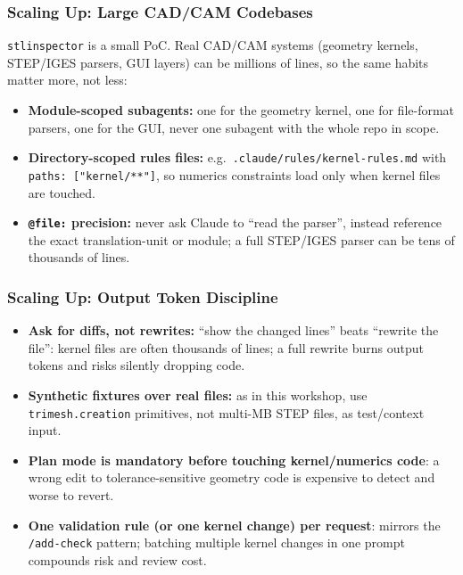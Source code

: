 \begin{frame}[fragile]\frametitle{Scaling Up: Large CAD/CAM Codebases}
\texttt{stlinspector} is a small PoC. Real CAD/CAM systems (geometry kernels, STEP/IGES parsers, GUI layers) can be millions of lines, so the same habits matter more, not less:
  \begin{itemize}
    \item \textbf{Module-scoped subagents:} one for the geometry kernel, one for file-format parsers, one for the GUI, never one subagent with the whole repo in scope.
    \item \textbf{Directory-scoped rules files:} e.g.\ \texttt{.claude/rules/\allowbreak kernel-rules.md} with \texttt{paths: ["kernel/**"]}, so numerics constraints load only when kernel files are touched.
    \item \textbf{\texttt{@file:} precision:} never ask Claude to ``read the parser'', instead reference the exact translation-unit or module; a full STEP/IGES parser can be tens of thousands of lines.
  \end{itemize}
\end{frame}


\begin{frame}[fragile]\frametitle{Scaling Up: Output Token Discipline}
  \begin{itemize}
    \item \textbf{Ask for diffs, not rewrites:} ``show the changed lines'' beats ``rewrite the file'': kernel files are often thousands of lines; a full rewrite burns output tokens and risks silently dropping code.
    \item \textbf{Synthetic fixtures over real files:} as in this workshop, use \texttt{trimesh.creation} primitives, not multi-MB STEP files, as test/context input.
    \item \textbf{Plan mode is mandatory before touching kernel/numerics code}: a wrong edit to tolerance-sensitive geometry code is expensive to detect and worse to revert.
    \item \textbf{One validation rule (or one kernel change) per request}: mirrors the \texttt{/add-check} pattern; batching multiple kernel changes in one prompt compounds risk and review cost.
  \end{itemize}
\end{frame}


